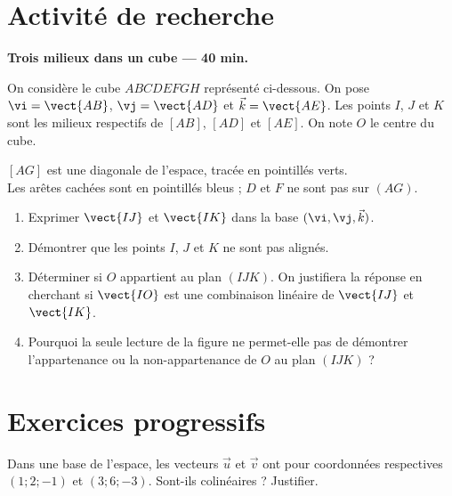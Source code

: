 \section{Activité de recherche}\textbf{Trois milieux dans un cube --- 40 min.}\par On considère le cube $ABCDEFGH$ représenté ci-dessous. On pose $\vi=\vect{AB}$, $\vj=\vect{AD}$ et $\vec k=\vect{AE}$. Les points $I$, $J$ et $K$ sont les milieux respectifs de $[AB]$, $[AD]$ et $[AE]$. On note $O$ le centre du cube.
\begin{center}\par\small $[AG]$ est une diagonale de l'espace, tracée en pointillés verts.\\Les arêtes cachées sont en pointillés bleus ; $D$ et $F$ ne sont pas sur $(AG)$.\end{center}
\begin{enumerate}\item Exprimer $\vect{IJ}$ et $\vect{IK}$ dans la base $(\vi,\vj,\vec k)$.
\item Démontrer que les points $I$, $J$ et $K$ ne sont pas alignés.
\item Déterminer si $O$ appartient au plan $(IJK)$. On justifiera la réponse en cherchant si $\vect{IO}$ est une combinaison linéaire de $\vect{IJ}$ et $\vect{IK}$.
\item Pourquoi la seule lecture de la figure ne permet-elle pas de démontrer l'appartenance ou la non-appartenance de $O$ au plan $(IJK)$ ?\end{enumerate}

\section{Exercices progressifs}

Dans une base de l'espace, les vecteurs $\vec u$ et $\vec v$ ont pour coordonnées respectives $(1;2;-1)$ et $(3;6;-3)$. Sont-ils colinéaires ? Justifier.

